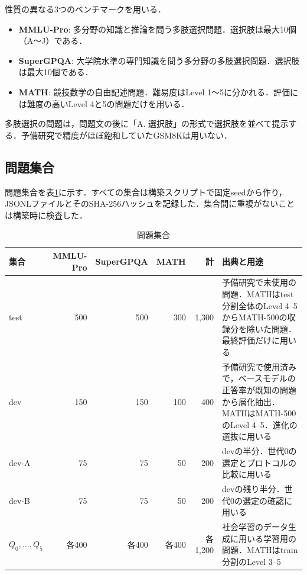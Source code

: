性質の異なる3つのベンチマークを用いる．
\begin{itemize}
\item \textbf{MMLU-Pro}\cite{wang2024mmlupro}: 多分野の知識と推論を問う多肢選択問題．選択肢は最大10個（A〜J）である．
\item \textbf{SuperGPQA}\cite{du2025supergpqa}: 大学院水準の専門知識を問う多分野の多肢選択問題．選択肢は最大10個である．
\item \textbf{MATH}\cite{hendrycks2021measuring}: 競技数学の自由記述問題．難易度はLevel 1〜5に分かれる．評価には難度の高いLevel 4と5の問題だけを用いる．
\end{itemize}
多肢選択の問題は，問題文の後に「A. 選択肢」の形式で選択肢を並べて提示する．予備研究で精度がほぼ飽和していたGSM8K\cite{cobbe2021training}は用いない．

\subsection{問題集合}
\label{sec:4.2.2}

問題集合を表\ref{tab:4.1}に示す．すべての集合は構築スクリプトで固定seedから作り，JSONLファイルとそのSHA-256ハッシュを記録した．集合間に重複がないことは構築時に検査した．

\begin{table}[htbp]
\caption{問題集合}
\label{tab:4.1}
\centering
\footnotesize
\setlength{\tabcolsep}{3pt}
\begin{tabular}{|l|r|r|r|r|p{5.3cm}|}
\hline
集合 & MMLU-Pro & SuperGPQA & MATH & 計 & 出典と用途 \\
\hline
test & 500 & 500 & 300 & 1,300 & 予備研究で未使用の問題．MATHはtest分割全体のLevel 4–5からMATH-500\cite{lightman2023lets}の収録分を除いた問題．最終評価だけに用いる \\
\hline
dev & 150 & 150 & 100 & 400 & 予備研究で使用済みで，ベースモデルの正答率が既知の問題から層化抽出．MATHはMATH-500のLevel 4–5．進化の選抜に用いる \\
\hline
\quad dev-A & 75 & 75 & 50 & 200 & devの半分．世代0の選定とプロトコルの比較に用いる \\
\hline
\quad dev-B & 75 & 75 & 50 & 200 & devの残り半分．世代0の選定の確認に用いる \\
\hline
$Q_0, \dots, Q_5$ & 各400 & 各400 & 各400 & 各1,200 & 社会学習のデータ生成に用いる学習用の問題．MATHはtrain分割のLevel 3–5 \\
\hline
\end{tabular}
\end{table}

